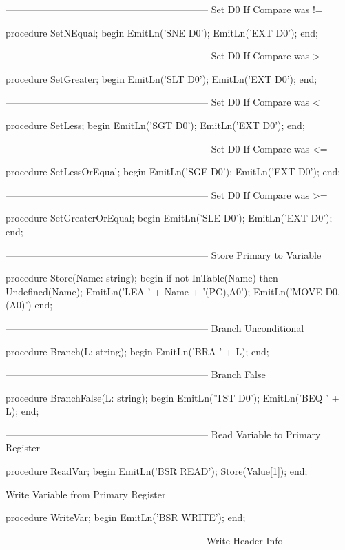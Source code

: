 \documentclass[float=false, crop=false]{standalone}
\begin{document}
\begin{code}
{---------------------------------------------------------------}
{ Set D0 If Compare was != }

procedure SetNEqual;
begin
   EmitLn('SNE D0');
   EmitLn('EXT D0');
end;


{---------------------------------------------------------------}
{ Set D0 If Compare was > }

procedure SetGreater;
begin
   EmitLn('SLT D0');
   EmitLn('EXT D0');
end;


{---------------------------------------------------------------}
{ Set D0 If Compare was < }

procedure SetLess;
begin
   EmitLn('SGT D0');
   EmitLn('EXT D0');
end;


{---------------------------------------------------------------}
{ Set D0 If Compare was <= }

procedure SetLessOrEqual;
begin
   EmitLn('SGE D0');
   EmitLn('EXT D0');
end;


{---------------------------------------------------------------}
{ Set D0 If Compare was >= }

procedure SetGreaterOrEqual;
begin
   EmitLn('SLE D0');
   EmitLn('EXT D0');
end;


{---------------------------------------------------------------}
{ Store Primary to Variable }

procedure Store(Name: string);
begin
   if not InTable(Name) then Undefined(Name);
   EmitLn('LEA ' + Name + '(PC),A0');
   EmitLn('MOVE D0,(A0)')
end;


{---------------------------------------------------------------}
{ Branch Unconditional  }

procedure Branch(L: string);
begin
   EmitLn('BRA ' + L);
end;


{---------------------------------------------------------------}
{ Branch False }

procedure BranchFalse(L: string);
begin
   EmitLn('TST D0');
   EmitLn('BEQ ' + L);
end;


{---------------------------------------------------------------}
{ Read Variable to Primary Register }

procedure ReadVar;
begin
   EmitLn('BSR READ');
   Store(Value[1]);
end;


{ Write Variable from Primary Register }

procedure WriteVar;
begin
   EmitLn('BSR WRITE');
end;


{--------------------------------------------------------------}
{ Write Header Info }


\end{code}
\end{document}
